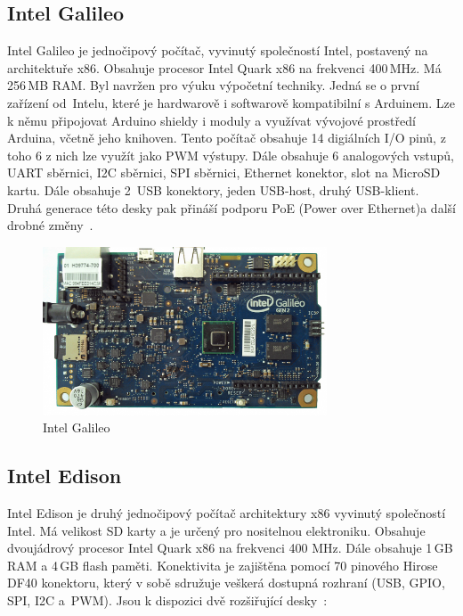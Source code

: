 		\subsection{Intel Galileo}
		Intel Galileo je jednočipový počítač, vyvinutý společností Intel, postavený na architektuře x86. Obsahuje procesor Intel Quark x86 na frekvenci 400\,MHz. Má 256\,MB RAM. Byl navržen pro výuku výpočetní techniky. Jedná se o první zařízení od~Intelu, které je hardwarově i softwarově kompatibilní s Arduinem. Lze k němu připojovat Arduino shieldy i moduly a využívat vývojové prostředí Arduina, včetně jeho knihoven. 
		Tento počítač obsahuje 14 digiálních I/O pinů, z toho 6 z nich lze využít jako PWM výstupy. Dále obsahuje 6 analogových vstupů, UART sběrnici, I2C sběrnici, SPI sběrnici, Ethernet konektor, slot na MicroSD kartu. Dále obsahuje 2~USB konektory, jeden USB-host, druhý USB-klient. Druhá generace této desky pak přináší podporu PoE (Power over Ethernet)a další drobné změny~\cite{IntelGalileo,ArduinoGalileo}.
\begin{figure}[!ht]
  \begin{center}
    \includegraphics[height=5cm]{obrazky/embed_intel_galileo}
  \end{center}
	\vspace{-20pt}
  \caption{Intel Galileo~\cite{IntelGalileo}}
	\vspace{-10pt}
\end{figure}
		
		
		\subsection{Intel Edison} 
		Intel Edison je druhý jednočipový počítač architektury x86 vyvinutý společností Intel. Má velikost SD karty a je určený pro nositelnou elektroniku. Obsahuje dvoujádrový procesor Intel Quark x86 na frekvenci 400 MHz. Dále obsahuje 1\,GB RAM a 4\,GB flash paměti. Konektivita je zajištěna pomocí 70 pinového Hirose DF40 konektoru, který v sobě sdružuje veškerá dostupná rozhraní (USB, GPIO, SPI, I2C a~PWM). Jsou k dispozici dvě rozšiřující desky~\cite{IntelEdison}:
			
